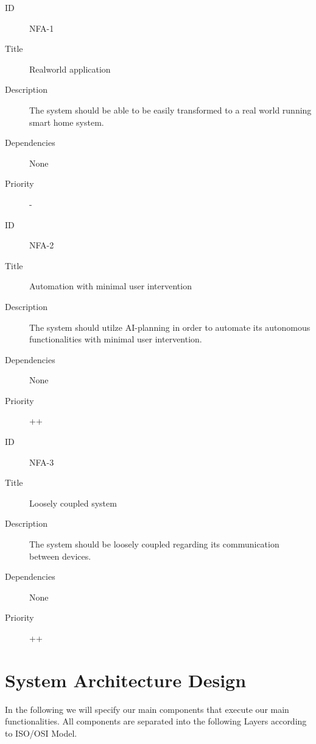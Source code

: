 \documentclass[runningheads]{llncs}
\begin{document}
    \begin{description}
        \item[ID] NFA-1
        \item[Title] Realworld application
        \item[Description] The system should be able to be easily transformed to a real world running smart home system.
        \item[Dependencies] None
        \item[Priority] -
    \end{description}

    \begin{description}
        \item[ID] NFA-2
        \item[Title] Automation with minimal user intervention
        \item[Description] The system should utilze AI-planning in order to automate its autonomous functionalities with minimal user intervention.
        \item[Dependencies] None
        \item[Priority] ++
    \end{description}

    \begin{description}
        \item[ID] NFA-3
        \item[Title] Loosely coupled system
        \item[Description] The system should be loosely coupled regarding its communication between devices.
        \item[Dependencies] None
        \item[Priority] ++
    \end{description}

    \section{System Architecture Design}

    In the following we will specify our main components that execute our main functionalities. All components are separated into the following Layers according to ISO/OSI Model.
\end{document}
